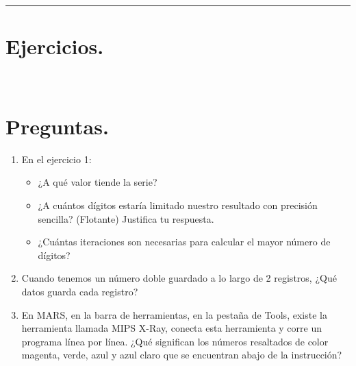 \documentclass[12pt,letterpaper]{article}
\begin{document}
\bigskip
\hrule height 0.1pt
\bigskip

\section*{Ejercicios.}

\begin{lstlisting}[style=cppstyle, caption={Código en C++ - Calculador de Serie}]
  
\end{lstlisting}

\section*{Preguntas.}

\begin{enumerate}
\item En el ejercicio 1:\\
  \bigskip
  \begin{itemize}
  \item ¿A qué valor tiende la serie?
    
    
  \item ¿A cuántos dígitos estaría limitado nuestro resultado con precisión sencilla? (Flotante) Justifica tu respuesta.
    
    
  \item ¿Cuántas iteraciones son necesarias para calcular el mayor número de dígitos?
    
    
  \end{itemize}
  \bigskip
  
\item Cuando tenemos un número doble guardado a lo largo de 2 registros, ¿Qué datos guarda cada registro?
  \bigskip
  
  \bigskip
  
\item En MARS, en la barra de herramientas, en la pestaña de Tools, existe la herramienta llamada MIPS X-Ray, conecta esta herramienta y corre un programa línea por línea. ¿Qué significan los números resaltados de color magenta, verde, azul y azul claro que se encuentran abajo de la instrucción?
  \bigskip
  
  \bigskip
  
\end{enumerate}
\end{document}
